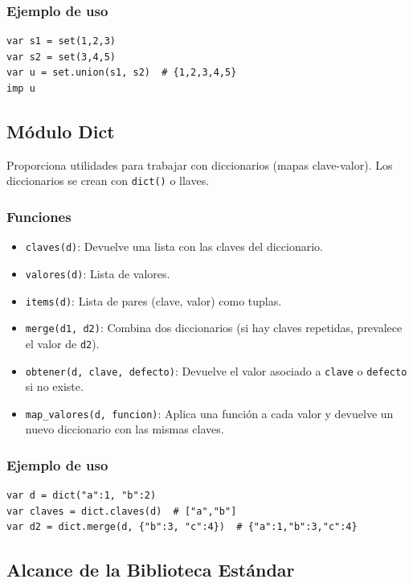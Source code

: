 \documentclass[12pt]{article}
\begin{document}
\subsubsection*{Ejemplo de uso}
\begin{lstlisting}
var s1 = set(1,2,3)
var s2 = set(3,4,5)
var u = set.union(s1, s2)  # {1,2,3,4,5}
imp u
\end{lstlisting}

\subsection{Módulo Dict}

Proporciona utilidades para trabajar con diccionarios (mapas clave-valor). Los diccionarios se crean con \texttt{dict()} o llaves.

\subsubsection*{Funciones}
\begin{itemize}
    \item \texttt{claves(d)}: Devuelve una lista con las claves del diccionario.
    \item \texttt{valores(d)}: Lista de valores.
    \item \texttt{items(d)}: Lista de pares (clave, valor) como tuplas.
    \item \texttt{merge(d1, d2)}: Combina dos diccionarios (si hay claves repetidas, prevalece el valor de \texttt{d2}).
    \item \texttt{obtener(d, clave, defecto)}: Devuelve el valor asociado a \texttt{clave} o \texttt{defecto} si no existe.
    \item \texttt{map\_valores(d, funcion)}: Aplica una función a cada valor y devuelve un nuevo diccionario con las mismas claves.
\end{itemize}

\subsubsection*{Ejemplo de uso}
\begin{lstlisting}
var d = dict("a":1, "b":2)
var claves = dict.claves(d)  # ["a","b"]
var d2 = dict.merge(d, {"b":3, "c":4})  # {"a":1,"b":3,"c":4}
\end{lstlisting}

\subsection*{Alcance de la Biblioteca Estándar}
\end{document}
